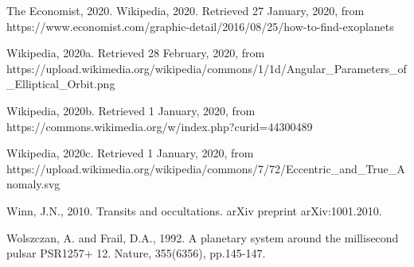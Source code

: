 \documentclass[11pt]{article}
\begin{document}
The Economist, 2020. Wikipedia, 2020. Retrieved 27 January, 2020, from
https://www.economist.com/graphic-detail/2016/08/25/how-to-find-exoplanets

Wikipedia, 2020a. Retrieved 28 February, 2020, from
https://upload.wikimedia.org/wikipedia/commons/1/1d/Angular\_Parameters\_of\_Elliptical\_Orbit.png

Wikipedia, 2020b. Retrieved 1 January, 2020, from
https://commons.wikimedia.org/w/index.php?curid=44300489

Wikipedia, 2020c. Retrieved 1 January, 2020, from
https://upload.wikimedia.org/wikipedia/commons/7/72/Eccentric\_and\_True\_Anomaly.svg

Winn, J.N., 2010. Transits and occultations. arXiv preprint
arXiv:1001.2010.

Wolszczan, A. and Frail, D.A., 1992. A planetary system around the
millisecond pulsar PSR1257+ 12. Nature, 355(6356), pp.145-147.


        
    
\end{document}

